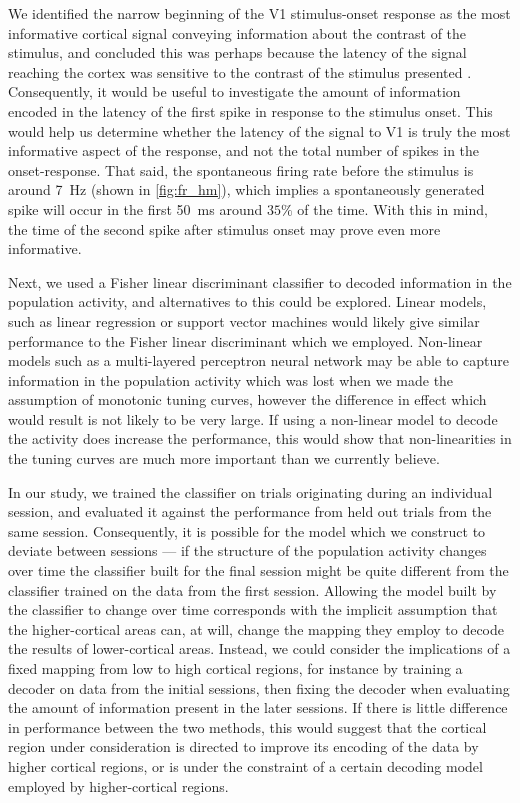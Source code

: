 We identified the narrow beginning of the \ac{V1} stimulus-onset response as the most informative cortical signal conveying information about the contrast of the stimulus, and concluded this was perhaps because the latency of the signal reaching the cortex was sensitive to the contrast of the stimulus presented \citep{Albrecht2002}.
Consequently, it would be useful to investigate the amount of information encoded in the latency of the first spike in response to the stimulus onset.
This would help us determine whether the latency of the signal to \ac{V1} is truly the most informative aspect of the response, and not the total number of spikes in the onset-response.
That said, the spontaneous firing rate before the stimulus is around \SI{7}{Hz} (shown in \autoref{fig:fr_hm}), which implies a spontaneously generated spike will occur in the first \SI{50}{\milli\second} around $35\%$ of the time.
With this in mind, the time of the second spike after stimulus onset may prove even more informative.

Next, we used a Fisher linear discriminant classifier to decoded information in the population activity, and alternatives to this could be explored.
Linear models, such as linear regression or support vector machines would likely give similar performance to the Fisher linear discriminant which we employed.
Non-linear models such as a multi-layered perceptron neural network may be able to capture information in the population activity which was lost when we made the assumption of monotonic tuning curves, however the difference in effect which would result is not likely to be very large.
If using a non-linear model to decode the activity does increase the performance, this would show that non-linearities in the tuning curves are much more important than we currently believe.

In our study, we trained the classifier on trials originating during an individual session, and evaluated it against the performance from held out trials from the same session.
Consequently, it is possible for the model which we construct to deviate between sessions --- if the structure of the population activity changes over time the classifier built for the final session might be quite different from the classifier trained on the data from the first session.
Allowing the model built by the classifier to change over time corresponds with the implicit assumption that the higher-cortical areas can, at will, change the mapping they employ to decode the results of lower-cortical areas.
Instead, we could consider the implications of a fixed mapping from low to high cortical regions, for instance by training a decoder on data from the initial sessions, then fixing the decoder when evaluating the amount of information present in the later sessions.
If there is little difference in performance between the two methods, this would suggest that the cortical region under consideration is directed to improve its encoding of the data by higher cortical regions, or is under the constraint of a certain decoding model employed by higher-cortical regions.

